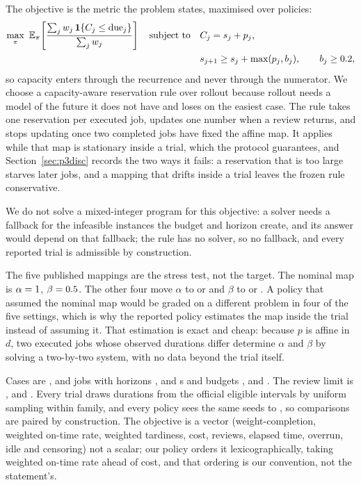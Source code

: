 \documentclass{swmcmthesis}
\begin{document}
The objective is the metric the problem states, maximised over policies:
\begin{equation}
\label{eq:p3obj}
\begin{aligned}[b]
\max_{\pi}\ \mathbb{E}_{\pi}\!\left[
\frac{\sum_{j} w_j\,\mathbf{1}\{C_j\le \mathrm{due}_j\}}{\sum_{j} w_j}\right]
\quad\text{subject to}\quad
& C_j=s_j+p_j,\\
& s_{j+1}\ge s_j+\max(p_j,b_j),\qquad b_j\ge 0.2,
\end{aligned}
\end{equation}
so capacity enters through the recurrence and never through the numerator. We choose a
capacity-aware reservation rule over rollout because rollout needs a model of the future
it does not have and loses on the easiest case. The rule takes one reservation per
executed job, updates one number when a review returns, and stops updating once two
completed jobs have fixed the affine map. It applies while that map is stationary inside
a trial, which the protocol guarantees, and Section~\ref{sec:p3disc} records the two ways
it fails: a reservation that is too large starves later jobs, and a mapping that drifts
inside a trial leaves the frozen rule conservative.

We do not solve a mixed-integer program for this objective: a solver needs a fallback
for the infeasible instances the budget and horizon create, and its answer would depend
on that fallback; the rule has no solver, so no fallback, and every reported trial is
admissible by construction.

The five published mappings are the stress test, not the target. The nominal map is
$\alpha=1$, $\beta=0.5$. The other four move $\alpha$ to
\slotAlphaLow{} or \slotAlphaHigh{} and $\beta$ to \slotBetaLow{} or \slotBetaHigh{}.
A policy that assumed the nominal map would be graded on a different problem in four
of the five settings, which is why the reported policy estimates the map inside the
trial instead of assuming it. That estimation is exact and cheap: because $p$ is
affine in $d$, two executed jobs whose observed durations differ determine $\alpha$
and $\beta$ by solving a two-by-two system, with no data beyond the trial itself.

Cases are \slotJobsSOne{}, \slotJobsSTwo{} and \slotJobsSThree{} jobs with horizons
\slotHSOne{}, \slotHSTwo{} and \slotHSThree{} s and budgets \slotBudgetSOne{},
\slotBudgetSTwo{} and \slotBudgetSThree{}. The review limit is \slotKSOne{},
\slotKSTwo{} and \slotKSThree{}. Every trial draws durations from the official
eligible intervals by uniform sampling within family, and every policy sees the same
\slotNSeeds{} seeds \slotSeedStart{} to \slotSeedEnd{}, so comparisons are paired by
construction. The objective is a vector (weight-completion, weighted on-time
rate, weighted tardiness, cost, reviews, elapsed time, overrun, idle and censoring) not a
scalar; our policy orders it lexicographically, taking weighted on-time rate ahead of
cost, and that ordering is our convention, not the statement's.
\end{document}
